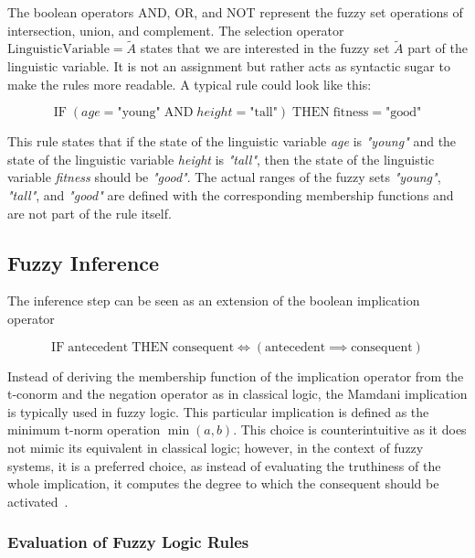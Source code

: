 The boolean operators AND, OR, and NOT represent the fuzzy set operations of intersection, union, and complement. The selection operator $\text{LinguisticVariable} = \tilde{A}$ states that we are interested in the fuzzy set $\tilde{A}$ part of the linguistic variable. It is not an assignment but rather acts as syntactic sugar to make the rules more readable. A typical rule could look like this:

\begin{equation*}
      \text{IF} \;( age = \text{"young"} \; \text{AND} \; height = \text{"tall"} ) \; \text{THEN} \; \text{fitness} = \text{"good"}
\end{equation*}

This rule states that if the state of the linguistic variable \emph{age} is \emph{"young"} and the state of the linguistic variable \emph{height} is \emph{"tall"}, then the state of the linguistic variable \emph{fitness} should be \emph{"good"}. The actual ranges of the fuzzy sets \emph{"young"}, \emph{"tall"}, and \emph{"good"} are defined with the corresponding membership functions and are not part of the rule itself.

\subsection{Fuzzy Inference}

The inference step can be seen as an extension of the boolean implication operator

\begin{equation*}
      \text{IF} \; \text{antecedent} \; \text{THEN} \; \text{consequent} \iff (\text{antecedent} \implies \text{consequent})
\end{equation*}

Instead of deriving the membership function of the implication operator from the t-conorm and the negation operator as in classical logic, the Mamdani implication is typically used in fuzzy logic. This particular implication is defined as the minimum t-norm operation $\min(a,b)$. This choice is counterintuitive as it does not mimic its equivalent in classical logic; however, in the context of fuzzy systems, it is a preferred choice, as instead of evaluating the truthiness of the whole implication, it computes the degree to which the consequent should be activated~\cite{BouchonMeunier1995}.

\subsubsection{Evaluation of Fuzzy Logic Rules}

